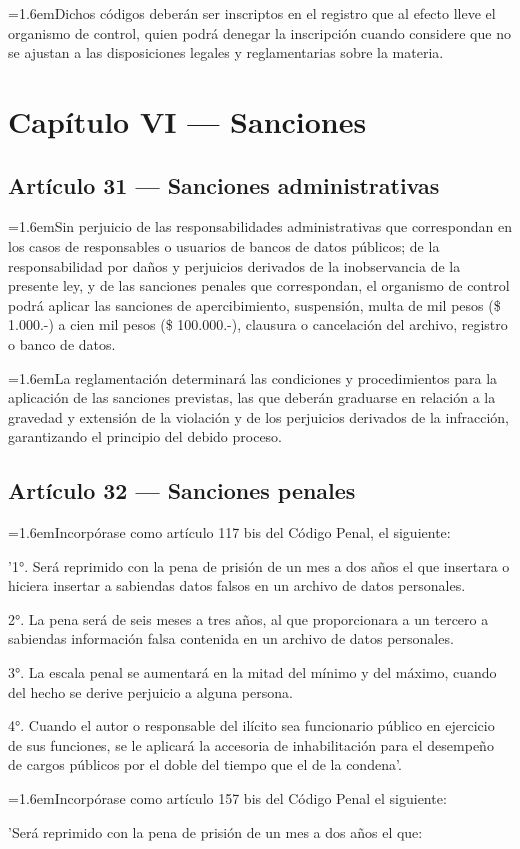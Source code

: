 \documentclass[10pt,a4paper]{article}
\newcommand{\articulo}[1]{\subsection{#1}}
\newcommand{\inciso}[2]{\par{\hangindent=1.6em\hangafter=1\makebox[1.6em][l]{#1}#2\par}}
\begin{document}
\inciso{2.}{Dichos códigos deberán ser inscriptos en el registro que al efecto lleve el organismo de control, quien podrá denegar la inscripción cuando considere que no se ajustan a las disposiciones legales y reglamentarias sobre la materia.}

\section{Capítulo VI --- Sanciones}
\articulo{Artículo 31 --- Sanciones administrativas}
\inciso{1.}{Sin perjuicio de las responsabilidades administrativas que correspondan en los casos de responsables o usuarios de bancos de datos públicos; de la responsabilidad por daños y perjuicios derivados de la inobservancia de la presente ley, y de las sanciones penales que correspondan, el organismo de control podrá aplicar las sanciones de apercibimiento, suspensión, multa de mil pesos (\$ 1.000.-) a cien mil pesos (\$ 100.000.-), clausura o cancelación del archivo, registro o banco de datos.}

\inciso{2.}{La reglamentación determinará las condiciones y procedimientos para la aplicación de las sanciones previstas, las que deberán graduarse en relación a la gravedad y extensión de la violación y de los perjuicios derivados de la infracción, garantizando el principio del debido proceso.}

\articulo{Artículo 32 --- Sanciones penales}
\inciso{1.}{Incorpórase como artículo 117 bis del Código Penal, el siguiente:}

'1°. Será reprimido con la pena de prisión de un mes a dos años el que insertara o hiciera insertar a sabiendas datos falsos en un archivo de datos personales.

2°. La pena será de seis meses a tres años, al que proporcionara a un tercero a sabiendas información falsa contenida en un archivo de datos personales.

3°. La escala penal se aumentará en la mitad del mínimo y del máximo, cuando del hecho se derive perjuicio a alguna persona.

4°. Cuando el autor o responsable del ilícito sea funcionario público en ejercicio de sus funciones, se le aplicará la accesoria de inhabilitación para el desempeño de cargos públicos por el doble del tiempo que el de la condena'.

\inciso{2.}{Incorpórase como artículo 157 bis del Código Penal el siguiente:}

'Será reprimido con la pena de prisión de un mes a dos años el que:
\end{document}
